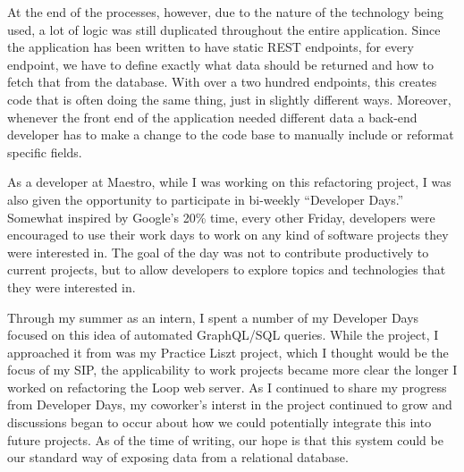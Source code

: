 At the end of the processes, however, due to the nature of the technology being used, a lot of logic was still duplicated throughout the entire application.  Since the application has been written to have static REST endpoints, for every endpoint, we have to define exactly what data should be returned and how to fetch that from the database. With over a two hundred endpoints, this creates code that is often doing the same thing, just in slightly different ways.  Moreover, whenever the front end of the application needed different data a back-end developer has to make a change to the code base to manually include or reformat specific fields.

As a developer at Maestro, while I was working on this refactoring project, I was also given the opportunity to participate in bi-weekly ``Developer Days.''  Somewhat inspired by Google's 20\% time, every other Friday, developers were encouraged to use their work days to work on any kind of software projects they were interested in.  The goal of the day was not to contribute productively to current projects, but to allow developers to explore topics and technologies that they were interested in.

Through my summer as an intern, I spent a number of my Developer Days focused on this idea of automated GraphQL/SQL queries. While the project, I approached it from was my Practice Liszt project, which I thought would be the focus of my SIP, the applicability to work projects became more clear the longer I worked on refactoring the Loop web server.  As I continued to share my progress from Developer Days, my coworker's interst in the project continued to grow and discussions began to occur about how we could potentially integrate this into future projects.  As of the time of writing, our hope is that this system could be our standard way of exposing data from a relational database.
